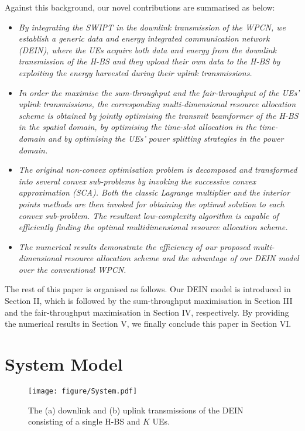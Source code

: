 \documentclass[12pt,draftcls,onecolumn,journal]{IEEEtran}
\begin{document}
Against this background, our novel contributions are summarised as below:
\begin{itemize}
	\item \textit{By integrating the SWIPT in the downlink transmission of the WPCN, we establish a generic data and energy integrated communication network (DEIN), where the UEs acquire both data and energy from the downlink transmission of the H-BS and they upload their own data to the H-BS by exploiting the energy harvested during their uplink transmissions.}
	\item \textit{In order the maximise the sum-throughput and the fair-throughput of the UEs' uplink transmissions, the corresponding multi-dimensional resource allocation scheme is obtained by jointly optimising the transmit beamformer of the H-BS in the spatial domain, by optimising the time-slot allocation in the time-domain and by optimising the UEs' power splitting strategies  in the power domain.}
	\item \textit{The original non-convex optimisation problem is decomposed and transformed into several convex sub-problems by invoking the successive convex approximation (SCA). Both the classic Lagrange multiplier and the interior points methods are then invoked for obtaining the optimal solution to each convex sub-problem. The resultant low-complexity algorithm is capable of efficiently finding the optimal multidimensional resource allocation scheme.}
	\item \textit{The numerical results demonstrate the efficiency of our proposed multi-dimensional resource allocation scheme and the advantage of our DEIN model over the conventional WPCN.}
\end{itemize}

The rest of this paper is organised as follows. Our DEIN model is introduced in Section II, which is followed by the sum-throughput maximisation in Section III and the fair-throughput maximisation in Section IV, respectively. By providing the numerical results in Section V, we finally conclude this paper in Section VI.


\section{System Model}

\begin{figure}[!t]	
	\centering
	\texttt{[image: figure/System.pdf]}
	\caption{The (a) downlink and (b) uplink transmissions of the DEIN consisting of a single H-BS and $K$ UEs.}
	\label{fig:system}
\end{figure}
\end{document}
